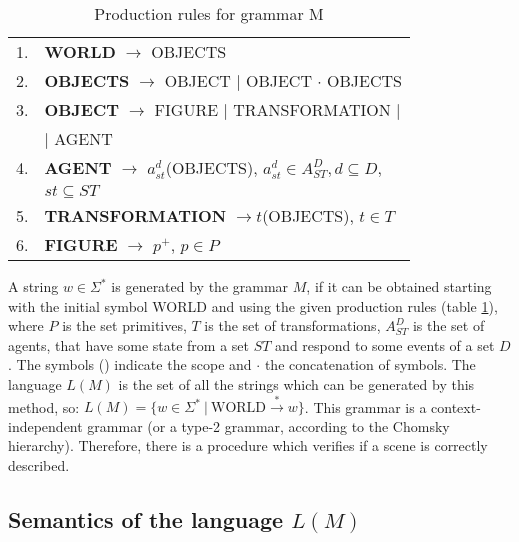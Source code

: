 \documentclass{aamas2012}
\begin{document}
\begin{table}
\centering
\caption{Production rules for grammar M}
\label{tab:rulesGrammar}
\begin{tabular}{|ll|}
    \hline

    1. & \textbf{WORLD} $\rightarrow$ OBJECTS \\

    2. & \textbf{OBJECTS} $\rightarrow$ OBJECT $|$ OBJECT $\cdot$ OBJECTS \\

    3. & \textbf{OBJECT} $\rightarrow$ FIGURE $|$ TRANSFORMATION $|$ \\
            & $|$ AGENT \\

    4. & \textbf{AGENT} $\rightarrow$ $a_{st}^d$(OBJECTS), $a_{st}^d \in A_{ST}^D, d \subseteq D$, \\
           &$st \subseteq ST$ \\

    5. & \textbf{TRANSFORMATION} $\rightarrow t$(OBJECTS), $t \in T$ \\

    6. & \textbf{FIGURE} $\rightarrow$ $p^+$, $p \in P$ \\

    \hline
\end{tabular}
\end{table}

A string $w \in \Sigma^*$ is generated by the grammar $M$, if it can be
obtained starting with the initial symbol WORLD and using the given production rules  (table \ref{tab:rulesGrammar}), where 
$P$ is the set primitives, $T$ is the set of transformations,  $A_{ST}^D$ is the set of agents, that have some state from a set $ST$ and respond to some events of a set $D$. The symbols () indicate the scope and $\cdotp$ the concatenation of symbols. The
language $L(M)$ is the set of all the strings
which can be generated by this method, so:
$L(M) = \lbrace w \in \Sigma^* \ | \ \text{WORLD} \stackrel{*}{\rightarrow} w \rbrace$.
This grammar is a context-independent grammar (or a type-2 grammar, according to the Chomsky
hierarchy). Therefore, there is a procedure which verifies if a scene is correctly described.


\subsection{Semantics of the language $L(M)$
\label{sec:semantics}}
\end{document}
